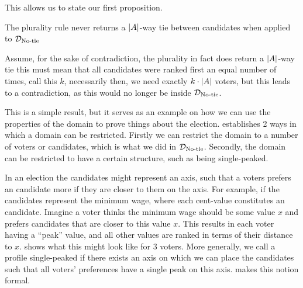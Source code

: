 This allows us to state our first proposition.

\begin{proposition}
	The plurality rule never returns a $|A|$-way tie between candidates when applied to $\mathcal{D}_{\textnormal{No-tie}}$
\end{proposition}

\begin{proofc}
	Assume, for the sake of contradiction, the plurality in fact does
	return a $|A|$-way tie this must mean that all candidates were ranked first an
	equal number of times, call this $k$, necessarily then, we need
	exactly $k \cdot |A|$ voters, but this leads to a
	contradiction, as this would no longer be inside $\mathcal{D}_{\textnormal{No-tie}}$.
\end{proofc}

This is a simple result, but it serves as an example on how we can use the properties of the domain to prove things about the election. \citet{gaertnerDomainRestrictions2002} establishes 2 ways in which a domain can be restricted. Firstly we can restrict the domain to a number of voters or candidates, which is what we did in $\mathcal{D}_{\textnormal{No-tie}}$. Secondly, the domain can be restricted to have a certain structure, such as being single-peaked.


In an election the candidates might represent an axis, such that a voters
prefers an candidate more if they are closer to them on the axis. For
example, if the candidates represent the minimum wage, where each cent-value
constitutes an candidate. Imagine a voter thinks the minimum wage should  be
some value $x$ and prefers candidates that are closer to this value $x$. This
results in each voter having a ``peak'' value, and all other values are ranked
in terms of their distance to $x$.  shows what this
might look like for 3 voters. More generally, we call a profile single-peaked
if there exists an axis on which we can place the candidates such that all
voters' preferences have a single peak on this axis. 
makes this notion formal.

